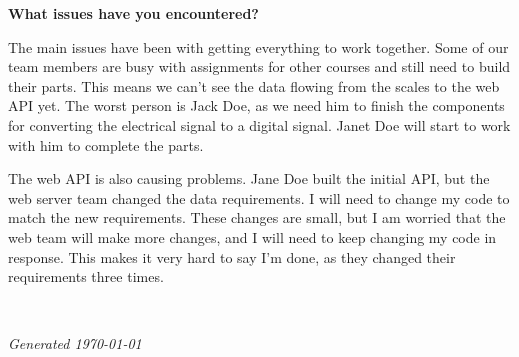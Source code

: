 \documentclass[11pt,a4paper]{article}
\begin{document}
\textbf{What issues have you encountered?}

The main issues have been with getting everything to work together. Some of our team members are busy with assignments for other courses and still need to build their parts. This means we can't see the data flowing from the scales to the web API yet. The worst person is Jack Doe, as we need him to finish the components for converting the electrical signal to a digital signal. Janet Doe will start to work with him to complete the parts.

The web API is also causing problems. Jane Doe built the initial API, but the web server team changed the data requirements. I will need to change my code to match the new requirements. These changes are small, but I am worried that the web team will make more changes, and I will need to keep changing my code in response. This makes it very hard to say I'm done, as they changed their requirements three times.

~\vfill

\noindent \textit{Generated \today}
\end{document}
